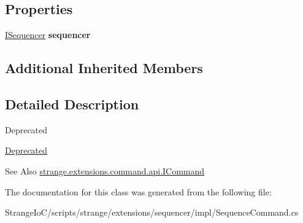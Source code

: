 \subsection*{Properties}
\begin{DoxyCompactItemize}
\item 
\hypertarget{classstrange_1_1extensions_1_1sequencer_1_1impl_1_1_sequence_command_a5d1248ae0b796af73a45eefa66bced14}{\hyperlink{interfacestrange_1_1extensions_1_1sequencer_1_1api_1_1_i_sequencer}{I\-Sequencer} {\bfseries sequencer}}\label{classstrange_1_1extensions_1_1sequencer_1_1impl_1_1_sequence_command_a5d1248ae0b796af73a45eefa66bced14}

\end{DoxyCompactItemize}
\subsection*{Additional Inherited Members}


\subsection{Detailed Description}
\begin{DoxyRefDesc}{Deprecated}
\item[\hyperlink{deprecated__deprecated000007}{Deprecated}]\end{DoxyRefDesc}


\begin{DoxySeeAlso}{See Also}
\hyperlink{interfacestrange_1_1extensions_1_1command_1_1api_1_1_i_command}{strange.\-extensions.\-command.\-api.\-I\-Command} 
\end{DoxySeeAlso}


The documentation for this class was generated from the following file\-:\begin{DoxyCompactItemize}
\item 
Strange\-Io\-C/scripts/strange/extensions/sequencer/impl/Sequence\-Command.\-cs\end{DoxyCompactItemize}
